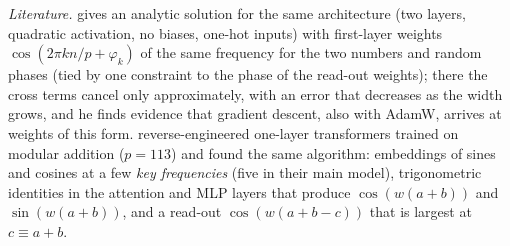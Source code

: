 \begin{beyond}
\emph{Literature.} \citet{gromov2023} gives an analytic solution for the same architecture (two layers, quadratic activation, no biases, one-hot inputs) with first-layer weights $\cos(2\pi kn/p+\varphi_k)$ of the same frequency for the two numbers and random phases (tied by one constraint to the phase of the read-out weights); there the cross terms cancel only approximately, with an error that decreases as the width grows, and he finds evidence that gradient descent, also with AdamW, arrives at weights of this form. \citet{nanda2023} reverse-engineered one-layer transformers trained on modular addition ($p=113$) and found the same algorithm: embeddings of sines and cosines at a few \emph{key frequencies} (five in their main model), trigonometric identities in the attention and MLP layers that produce $\cos(w(a+b))$ and $\sin(w(a+b))$, and a read-out $\cos(w(a+b-c))$ that is largest at $c\equiv a+b$.
\end{beyond}

